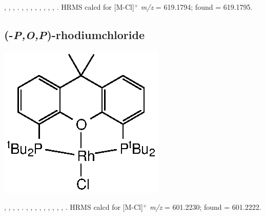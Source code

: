 ,
,
,
.
,
,
,
,
,
,
,
,
.
HRMS calcd for  [M-Cl]$^+$ \emph{m/z} = 619.1794; found = 619.1795.



\subsection*{(\tBuXantphosk-\emph{P,O,P})-rhodiumchloride}

\begin{structure}[h]
\begin{center}
\includegraphics{../Structures/RhCl(CtBu).eps}
\end{center}
\end{structure}

,
,
,
,
.
,
,
,
,
,
,
,
,
,
.
HRMS calcd for  [M-Cl]$^+$ \emph{m/z} = 601.2230; found = 601.2222.


